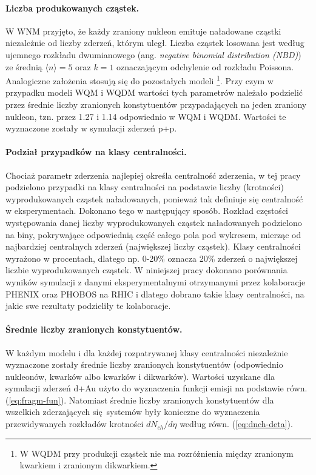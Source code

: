 \documentclass[a4paper,12pt]{article}
\begin{document}
\paragraph{Liczba produkowanych cząstek.}
W WNM przyjęto, że każdy zraniony nukleon emituje naładowane cząstki niezależnie od liczby zderzeń, którym uległ. Liczba cząstek losowana jest według ujemnego rozkładu dwumianowego (ang. \textit{negative binomial distribution (NBD)}) ze średnią $\langle n \rangle = 5$ oraz $k = 1$ \cite{Ansorge:1988kn} oznaczającym odchylenie od rozkładu Poissona. Analogiczne założenia stosują się do pozostałych modeli \footnote{W WQDM przy produkcji cząstek nie ma rozróżnienia między zranionym kwarkiem i zranionym dikwarkiem.}. Przy czym w przypadku modeli WQM \quad \quad \quad \quad \quad \quad i WQDM wartości tych parametrów należało podzielić przez średnie liczby zranionych konstytuentów przypadających na jeden zraniony nukleon, tzn. przez 1.27 i 1.14 odpowiednio w WQM i WQDM. Wartości te wyznaczone zostały w symulacji zderzeń p+p.

\paragraph{Podział przypadków na klasy centralności.}
Chociaż parametr zderzenia najlepiej określa centralność zderzenia, w tej pracy podzielono przypadki na klasy centralności na podstawie liczby (krotności) wyprodukowanych cząstek naładowanych, ponieważ tak definiuje się centralność w eksperymentach. Dokonano tego w następujący sposób. Rozkład częstości występowania danej liczby wyprodukowanych cząstek naładowanych podzielono na biny, pokrywające odpowiednią część całego pola pod wykresem, mierząc od najbardziej centralnych zderzeń (największej liczby cząstek). Klasy centralności wyrażono w procentach, dlatego np. 0-20\% oznacza 20\% zderzeń o największej liczbie wyprodukowanych cząstek. W niniejszej pracy dokonano porównania wyników symulacji z danymi eksperymentalnymi otrzymanymi przez kolaboracje PHENIX oraz PHOBOS na RHIC i dlatego dobrano takie klasy centralności, na jakie swe rezultaty podzieliły te kolaboracje.

\paragraph{Średnie liczby zranionych konstytuentów.}
W każdym modelu i dla każdej rozpatrywanej klasy centralności niezależnie wyznaczone zostały średnie liczby zranionych konstytuentów (odpowiednio nukleonów, kwarków albo kwarków i dikwarków). Wartości uzyskane dla symulacji zderzeń d+Au użyto do wyznaczenia funkcji emisji na podstawie równ. (\ref{eq:fragm-fun}). Natomiast średnie liczby zranionych konstytuentów dla wszelkich zderzających się systemów były konieczne do wyznaczenia przewidywanych rozkładów krotności $dN_{ch}/d\eta$ według równ. (\ref{eq:dnch-deta}).
\end{document}
